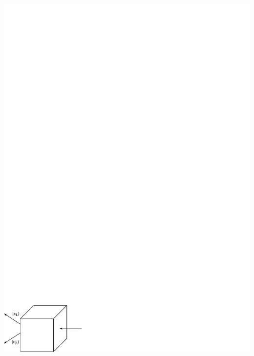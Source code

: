 \documentclass[a4paper]{scrartcl}
\begin{document}
{\begin{center}
\includegraphics{038ZirkularPolPhotonen}\end{center}

}
\end{document}
